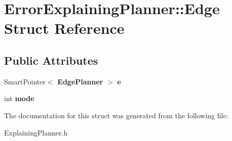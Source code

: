 \section{Error\+Explaining\+Planner\+:\+:Edge Struct Reference}
\label{structErrorExplainingPlanner_1_1Edge}
\subsection*{Public Attributes}
\begin{DoxyCompactItemize}
\item 
Smart\+Pointer$<$ {\bf Edge\+Planner} $>$ {\bfseries e}\label{structErrorExplainingPlanner_1_1Edge_a0fd668bcfe7cd6d373b234ac4bbaa5f6}

\item 
int {\bfseries mode}\label{structErrorExplainingPlanner_1_1Edge_ab7d00c2327c0da70fff0b4d6198e6d40}

\end{DoxyCompactItemize}


The documentation for this struct was generated from the following file\+:\begin{DoxyCompactItemize}
\item 
Explaining\+Planner.\+h\end{DoxyCompactItemize}
